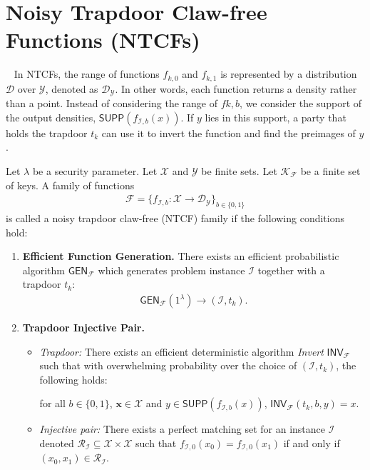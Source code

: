 \documentclass[cryptography,review,submit,pdftex,moreauthors,amsmath,amssymb,aps,strict]{Definitions/mdpi}
\begin{document}
\section[\appendixname~\thesection]{Noisy Trapdoor Claw-free Functions (NTCFs)}~\label{NTCFs}
In NTCFs, the range of functions $f_{k,0}$ and $f_{k,1}$ is represented by a distribution $\mathcal{D}$ over $\mathcal{Y}$, denoted as $\mathcal{D}_{\mathcal{Y}}$. In other words, each function returns a density rather than a point. Instead of considering the range of $f{k,b}$, we consider the support of the output densities, $\mathsf{SUPP}(f_{\mathcal{I},b}(x))$. If $y$ lies in this support, a party that holds the trapdoor $t_k$ can use it to invert the function and find the preimages of $y$.

\begin{Definition}
   Let $\lambda$ be a security parameter. Let $\mathcal{X}$ and $\mathcal{Y}$ be finite sets. Let $\mathcal{K}_{\mathcal{F}}$ be a finite set of keys. A family of functions
   \begin{align}
       \mathcal{F}=\{f_{\mathcal{I},b}:\mathcal{X}\to \mathcal{D}_{\mathcal{Y}}\}_{b\in\{0,1\}}
   \end{align}
is called a noisy trapdoor claw-free (NTCF) family if the following conditions hold:
\begin{enumerate}
    \item \textbf{Efficient Function Generation.} There exists an efficient probabilistic algorithm $\mathsf{GEN}_{\mathcal{F}}$ which generates problem instance $\mathcal{I}$ together with a trapdoor $t_{k}$:
    \begin{align}
        \mathsf{GEN}_{\mathcal{F}}(1^{\lambda})\to (\mathcal{I},t_k).
    \end{align}
    \item \textbf{Trapdoor Injective Pair.}
    \begin{itemize}
        \item \textit{Trapdoor:} There exists an efficient deterministic algorithm \textit{Invert} $\mathsf{INV}_\mathcal{F}$ such that with overwhelming probability over the choice of $(\mathcal{I},t_k)$, the following holds:
        \begin{center}
            for all $b\in\{0,1\}$, $\mathbf{x}\in \mathcal{X}$ and $y\in \mathsf{SUPP}(f_{\mathcal{I},b}(x))$, $\mathsf{INV}_\mathcal{F}(t_k,b,y)=x$.
        \end{center}
        \item \textit{Injective pair:} There exists a perfect matching set for an instance $\mathcal{I}$ denoted  $\mathcal{R}_{\mathcal{I}}\subseteq \mathcal{X}\times \mathcal{X}$ such that $f_{\mathcal{I},0}(x_0)=f_{\mathcal{I},0}(x_1)$ if and only if $(x_0,x_1)\in \mathcal{R}_{\mathcal{I}}$. 

\end{itemize}
\end{enumerate}
\end{Definition}
\end{document}
